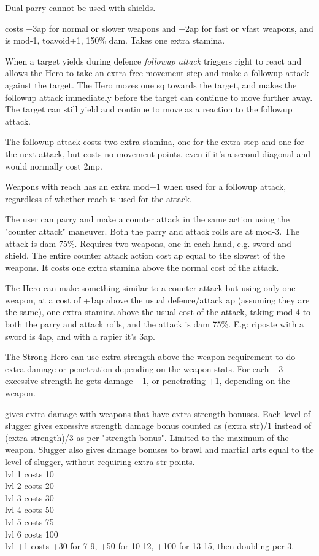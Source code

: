 Dual parry cannot be used with shields.


 costs +3ap for normal or slower weapons and +2ap for fast or vfast weapons, and is mod-1, toavoid+1, 150\% dam. Takes one extra stamina.


 When a target yields during defence \emph{followup attack} triggers right to react and allows the Hero to take an extra free movement step and make a followup attack against the target. The Hero moves one sq towards the target, and makes the followup attack immediately before the target can continue to move further away. The target can still yield and continue to move as a reaction to the followup attack.

The followup attack costs two extra stamina, one for the extra step and one for the next attack, but costs no movement points, even if it's a second diagonal and would normally cost 2mp.

Weapons with reach has an extra mod+1 when used for a followup attack, regardless of whether reach is used for the attack.


 The user can parry and make a counter attack in the same action using the "counter attack" maneuver. Both the parry and attack rolls are at mod-3. The attack is dam 75\%. Requires two weapons, one in each hand, e.g. sword and shield. The entire counter attack action cost ap equal to the slowest of the weapons. It costs one extra stamina above the normal cost of the attack.


 The Hero can make something similar to a counter attack but using only one weapon, at a cost of +1ap above the usual defence/attack ap (assuming they are the same), one extra stamina above the usual cost of the attack, taking mod-4 to both the parry and attack rolls, and the attack is dam 75\%. E.g: riposte with a sword is 4ap, and with a rapier it's 3ap.


 The Strong Hero can use extra strength above the weapon requirement to do extra damage or penetration depending on the weapon stats. For each +3 excessive strength he gets damage +1, or penetrating +1, depending on the weapon.


 gives extra damage with weapons that have extra strength bonuses. Each level of slugger gives excessive strength damage bonus counted as (extra str)/1 instead of (extra strength)/3 as per "strength bonus". Limited to the maximum of the weapon. Slugger also gives damage bonuses to brawl and martial arts equal to the level of slugger, without requiring extra str points. \\
lvl  1  costs  10 \\
lvl  2  costs  20 \\
lvl  3  costs  30 \\
lvl  4  costs  50 \\
lvl  5  costs  75 \\
lvl  6  costs 100 \\
lvl +1  costs +30 for 7-9, +50 for 10-12, +100 for 13-15, then doubling per 3.

